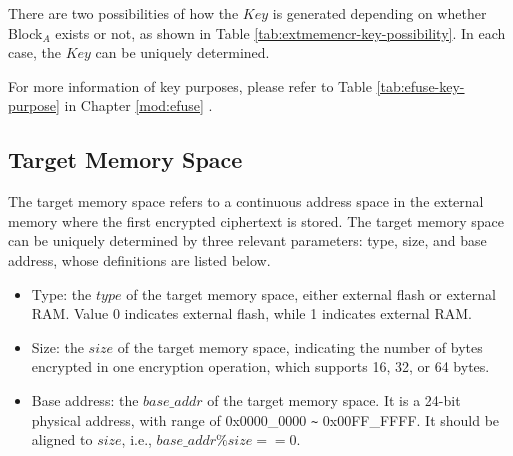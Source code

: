 \documentclass[main\_\_EN.tex]{subfiles}
\begin{document}
There are two possibilities of how the \begin{math}\mathit{Key}\end{math} is generated depending on whether Block$_A$ exists or not, as shown in Table \ref{tab:extmemencr-key-possibility}. In each case, the \begin{math}\mathit{Key}\end{math} can be uniquely determined.



For more information of key purposes, please refer to Table \ref{tab:efuse-key-purpose} \textit{} in Chapter \ref{mod:efuse} \textit{}.

\subsection{Target Memory Space}
\label{sec:extmemencr-target-space}

The target memory space refers to a continuous address space in the external memory where the first encrypted ciphertext is stored. The target memory space can be uniquely determined by three relevant parameters: type, size, and base address, whose definitions are listed below.

\begin{itemize}
    \item Type: the \begin{math} type \end{math} of the target memory space, either external flash or external RAM. Value 0 indicates external flash, while 1 indicates external RAM.
    \item Size: the \begin{math} size \end{math} of the target memory space, indicating the number of bytes encrypted in one encryption operation, which supports 16, 32, or 64 bytes.
    \item Base address: the \begin{math} base\_addr\end{math} of the target memory space. It is a 24-bit physical address, with range of 0x0000\_0000 \verb+~+ 0x00FF\_FFFF. It should be aligned to \begin{math} size \end{math}, i.e., \begin{math} base\_addr \% size == 0 \end{math}.
\end{itemize}
\end{document}
